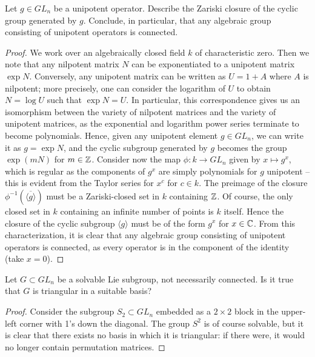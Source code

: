 \documentclass{../../mathnotes}
\begin{document}
\begin{exc}
    Let $g\in GL_n$ be a unipotent operator. Describe the Zariski closure of the
    cyclic group generated by $g$. Conclude, in particular, that any algebraic
    group consisting of unipotent operators is connected.
\end{exc}
\begin{proof}
    We work over an algebraically closed field $k$ of characteristic zero. Then
    we note that any nilpotent matrix $N$ can be exponentiated to a unipotent
    matrix $\exp N$. Conversely, any unipotent matrix can be written as $U=1+A$
    where $A$ is nilpotent; more precisely, one can consider the logarithm of $U$
    to obtain $N=\log U$ such that $\exp N=U$. In particular, this correspondence
    gives us an isomorphism between the variety of nilpotent matrices and the
    variety of unipotent matrices, as the exponential and logarithm power series
    terminate to become polynomials. Hence, given any unipotent element $g\in GL_n$,
    we can write it as $g=\exp N$, and the cyclic subgroup generated by $g$ becomes
    the group $\exp(mN)$ for $m\in\mathbb{Z}$. Consider now the map $\phi:k\to GL_n$
    given by $x\mapsto g^x$, which is regular as the components of $g^x$ are simply
    polynomials for $g$ unipotent -- this is evident from the Taylor series for $x^c$
    for $c\in k$. The preimage of the closure $\phi^{-1}(\overline{\langle g\rangle})$
    must be a Zariski-closed set in $k$ containing $\mathbb{Z}$. Of course, the only closed
    set in $k$ containing an infinite number of points is $k$ itself. Hence
    the closure of the cyclic subgroup $\langle g\rangle$ must be of the form $g^x$
    for $x\in\mathbb{C}$. From this characterization, it is clear that any algebraic group
    consisting of unipotent operators is connected, as every operator is in the
    component of the identity (take $x=0$).
\end{proof}

\begin{exc}
    Let $G\subset GL_n$ be a solvable Lie subgroup, not necessarily connected. Is
    it true that $G$ is triangular in a suitable basis?
\end{exc}
\begin{proof}
    Consider the subgroup $S_2\subset GL_n$ embedded as a $2\times 2$ block in the
    upper-left corner with 1's down the diagonal. The group $S^2$ is of course solvable,
    but it is clear that there exists no basis in which it is triangular: if there were,
    it would no longer contain permutation matrices.
\end{proof}
\end{document}
